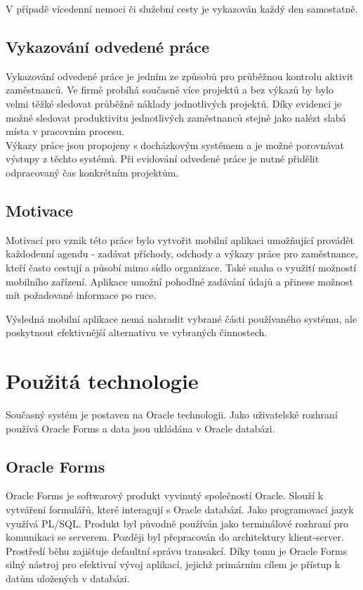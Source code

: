 \documentclass{diplomka}
\begin{document}
V případě vícedenní nemoci či služební cesty je vykazován každý den samostatně.

\subsection{Vykazování odvedené práce}
Vykazování odvedené práce je jedním ze způsobů pro průběžnou kontrolu aktivit zaměstnanců. Ve firmě probíhá současně více projektů a bez výkazů by bylo velmi těžké sledovat průběžně náklady jednotlivých projektů. 
Díky evidenci je možné sledovat produktivitu jednotlivých zaměstnanců stejně jako nalézt slabá místa v pracovním procesu.
\\ \indent Výkazy práce jsou propojeny s docházkovým systémem a je možné porovnávat výstupy z těchto systémů. Při evidování odvedené práce je nutné přidělit odpracovaný čas konkrétním projektům. 

\subsection{Motivace}
Motivací pro vznik této práce bylo vytvořit mobilní aplikaci umožňující provádět každodenní agendu - zadávat příchody, odchody a výkazy práce pro zaměstnance, kteří často cestují a působí mimo sídlo organizace. Také snaha o využití možností mobilního zařízení. Aplikace umožní pohodlné zadávání údajů a přinese možnost mít požadované informace po ruce.

Výsledná mobilní aplikace nemá nahradit vybrané části používaného systému, ale poskytnout efektivnější alternativu ve vybraných činnostech.


\section{Použitá technologie}
Současný systém je postaven na Oracle technologii. Jako uživatelské rozhraní používá Oracle Forms a data jsou ukládána v Oracle databázi.
 
\subsection{Oracle Forms}
Oracle Forms\cite{forms} je softwarový produkt vyvinutý společností Oracle. Slouží k vytváření formulářů, které interagují s Oracle databází. Jako programovací jazyk využívá PL/SQL. Produkt byl původně používán jako terminálové rozhraní pro komunikaci se serverem. Později byl přepracován do architektury klient-server.\\ \indent
Prostředí běhu zajišťuje defaultní správu transakcí. Díky tomu je Oracle Forms silný nástroj pro efektivní vývoj aplikací, jejichž primárním cílem je přístup k datům uložených v databázi. 
\end{document}
